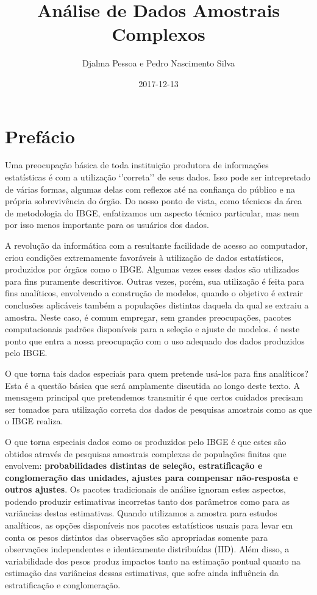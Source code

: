 \documentclass[]{book}
\title{Análise de Dados Amostrais Complexos}
\author{Djalma Pessoa e Pedro Nascimento Silva}
\date{2017-12-13}
\theoremstyle{definition}
\theoremstyle{definition}
\theoremstyle{definition}
\theoremstyle{remark}
\begin{document}
\maketitle

{
\setcounter{tocdepth}{1}
\tableofcontents
}
\chapter*{Prefácio}\label{prefacio}

Uma preocupação básica de toda instituição produtora de informações
estatísticas é com a utilização `'correta'' de seus dados. Isso pode ser
intrepretado de várias formas, algumas delas com reflexos até na
confiança do público e na própria sobrevivência do órgão. Do nosso ponto
de vista, como técnicos da área de metodologia do IBGE, enfatizamos um
aspecto técnico particular, mas nem por isso menos importante para os
usuários dos dados.

A revolução da informática com a resultante facilidade de acesso ao
computador, criou condições extremamente favoráveis à utilização de
dados estatísticos, produzidos por órgãos como o IBGE. Algumas vezes
esses dados são utilizados para fins puramente descritivos. Outras
vezes, porém, sua utilização é feita para fins analíticos, envolvendo a
construção de modelos, quando o objetivo é extrair conclusões aplicáveis
também a populações distintas daquela da qual se extraiu a amostra.
Neste caso, é comum empregar, sem grandes preocupações, pacotes
computacionais padrões disponíveis para a seleção e ajuste de modelos. é
neste ponto que entra a nossa preocupação com o uso adequado dos dados
produzidos pelo IBGE.

O que torna tais dados especiais para quem pretende usá-los para fins
analíticos? Esta é a questão básica que será amplamente discutida ao
longo deste texto. A mensagem principal que pretendemos transmitir é que
certos cuidados precisam ser tomados para utilização correta dos dados
de pesquisas amostrais como as que o IBGE realiza.

O que torna especiais dados como os produzidos pelo IBGE é que estes são
obtidos através de pesquisas amostrais complexas de populações finitas
que envolvem: \textbf{probabilidades distintas de seleção,
estratificação e conglomeração das unidades, ajustes para compensar
não-resposta e outros ajustes}. Os pacotes tradicionais de análise
ignoram estes aspectos, podendo produzir estimativas incorretas tanto
dos parâmetros como para as variâncias destas estimativas. Quando
utilizamos a amostra para estudos analíticos, as opções disponíveis nos
pacotes estatísticos usuais para levar em conta os pesos distintos das
observações são apropriadas somente para observações independentes e
identicamente distribuídas (IID). Além disso, a variabilidade dos pesos
produz impactos tanto na estimação pontual quanto na estimação das
variâncias dessas estimativas, que sofre ainda influência da
estratificação e conglomeração.
\end{document}
